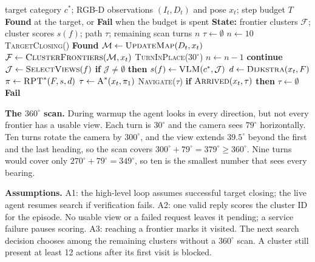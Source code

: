 \documentclass{article}
\begin{document}
\begin{algorithm}[t]
\caption{VLM-Guided Object Search}
\begin{algorithmic}[1]
\Require target category $c^*$; RGB-D observations $(I_t, D_t)$ and pose $x_t$; step budget $T$
\Ensure \textbf{Found} at the target, or \textbf{Fail} when the budget is spent
\State \textbf{State:} frontier clusters $\mathcal F$; cluster scores $s(f)$; path $\tau$; remaining scan turns $n$
\State $\tau \gets \emptyset$
\State $n \gets 10$
     
        \State \textsc{TargetClosing}()
        \State \Return \textbf{Found} 
    \EndIf
    \State $\mathcal M \gets \textsc{UpdateMap}(D_t,x_t)$
    \State $\mathcal F \gets \textsc{ClusterFrontiers}(\mathcal M,x_t)$ 
     
        \State \textsc{TurnInPlace}($30^\circ$)
        \State $n \gets n - 1$
        \State \textbf{continue}
    \EndIf
        \State $\mathcal J \gets \textsc{SelectViews}(f)$ 
        \State \textbf{if} $\mathcal J \ne \emptyset$ \textbf{then} $s(f) \gets \textsc{VLM}(c^*,\mathcal J)$
    \EndFor
    \If{$\tau = \emptyset$}
        \State $d \gets \textsc{Dijkstra}(x_t,F)$ 
        \State $\pi \gets \textsc{RPT}^*(F,s,d)$
        \State $\tau \gets \textsc{A}^*(x_t,\pi_1)$
    \EndIf
    \State \textsc{Navigate}($\tau$)
    \State \textbf{if} $\textsc{Arrived}(x_t,\tau)$ \textbf{then} $\tau \gets \emptyset$
\EndWhile
\State \Return \textbf{Fail}
\end{algorithmic}
\end{algorithm}

\noindent\textbf{The $360^\circ$ scan.}
During warmup the agent looks in every direction, but not every frontier has a usable view.
Each turn is $30^\circ$ and the camera sees $79^\circ$ horizontally.
Ten turns rotate the camera by $300^\circ$, and the view extends $39.5^\circ$ beyond the first and the last heading, so the scan covers $300^\circ + 79^\circ = 379^\circ \geq 360^\circ$.
Nine turns would cover only $270^\circ + 79^\circ = 349^\circ$, so ten is the smallest number that sees every bearing.

\medskip
\noindent\textbf{Assumptions.}
A1: the high-level loop assumes successful target closing; the live agent resumes search if verification fails.
A2: one valid reply scores the cluster ID for the episode. No usable view or a failed request leaves it pending; a service failure pauses scoring.
A3: reaching a frontier marks it visited. The next search decision chooses among the remaining clusters without a $360^\circ$ scan. A cluster still present at least 12 actions after its first visit is blocked.
\end{document}
